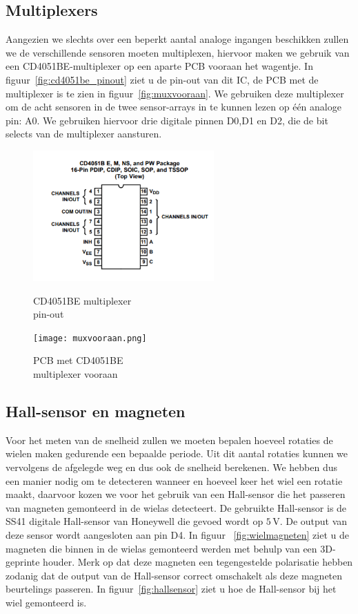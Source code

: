 \subsection{Multiplexers}
Aangezien we slechts over een beperkt aantal analoge ingangen beschikken zullen we de verschillende sensoren moeten multiplexen, hiervoor maken we gebruik van een CD4051BE-multiplexer op een aparte PCB vooraan het wagentje. In figuur~\vref{fig:cd4051be_pinout} ziet u de pin-out van dit IC, de PCB met de multiplexer is te zien in figuur~\vref{fig:muxvooraan}. We gebruiken deze multiplexer om de acht sensoren in de twee sensor-arrays in te kunnen lezen op \'e\'en analoge pin: A0. We gebruiken hiervoor drie digitale pinnen D0,D1 en D2, die de bit selects van de multiplexer aansturen.

\begin{figure}[H]
	\centering
	\begin{minipage}[b]{0.4\textwidth}
		\includegraphics[height=5cm]{cd4051be_pinout.png}
		\caption{CD4051BE multiplexer\\pin-out}
		\label{fig:cd4051be_pinout}
	\end{minipage}
	\hfill
	\begin{minipage}[b]{0.4\textwidth}
		\texttt{[image: muxvooraan.png]}
		\caption{PCB met CD4051BE\\multiplexer vooraan}
		\label{fig:muxvooraan}
	\end{minipage}
\end{figure}
\subsection{Hall-sensor en magneten}\label{sec:hall-sensor}
Voor het meten van de snelheid zullen we moeten bepalen hoeveel rotaties de wielen maken gedurende een bepaalde periode. Uit dit aantal rotaties kunnen we vervolgens de afgelegde weg en dus ook de snelheid berekenen. We hebben dus een manier nodig om te detecteren wanneer en hoeveel keer het wiel een rotatie maakt, daarvoor kozen we voor het gebruik van een Hall-sensor die het passeren van magneten gemonteerd in de wielas detecteert. De gebruikte Hall-sensor is de SS41 digitale Hall-sensor van Honeywell die gevoed wordt op $5\,\mathrm{V}$. De output van deze sensor wordt aangesloten aan pin D4. In figuur ~\vref{fig:wielmagneten} ziet u de magneten die binnen in de wielas gemonteerd werden met behulp van een 3D-geprinte houder. Merk op dat deze magneten een tegengestelde polarisatie hebben zodanig dat de output van de Hall-sensor correct omschakelt als deze magneten beurtelings passeren. In figuur~\vref{fig:hallsensor} ziet u hoe de Hall-sensor bij het wiel gemonteerd is.

